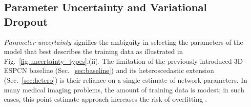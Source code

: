



%
%

\subsection{Parameter Uncertainty and Variational Dropout} 
\textit{Parameter uncertainty} signifies the ambiguity in selecting the parameters of the model that best describes the training data as illustrated in Fig.~\ref{fig:uncertainty_types}.(ii). The limitation of the previously introduced 3D-ESPCN baseline (Sec.~\ref{sec:baseline}) and its heteroscedastic extension (Sec.~\ref{sec:hetero}) is their reliance on a single estimate of network parameters. In many medical imaging problems, the amount of training data is modest; in such cases, this point estimate approach increases the risk of overfitting \cite{gal2015dropout}. 

